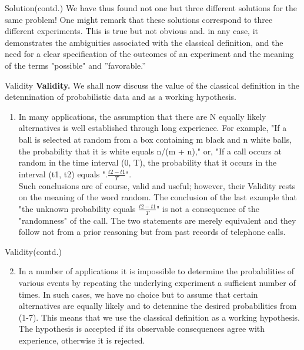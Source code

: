 \documentclass{beamer}
\begin{document}
\begin{frame}{Solution(contd.)}
    We have thus found not one but three different solutions for the same problem! One might remark that these solutions correspond to three different experiments. This is true but not obvious and. in any case, it demonstrates the ambiguities associated with the classical definition, and the need for a clear specification of the outcomes of an experiment and the meaning of the terms "possible" and ''favorable.''\\
\end{frame}
\begin{frame}{Validity}
\textbf{Validity.} We shall now discuss the value of the classical definition in the detennination of probabilistic data and as a working hypothesis.

\begin{enumerate}
\item In many applications, the assumption that there are N equally likely alternatives is well established through long experience. For example, "If a ball is selected at random from a box containing m black and n white balls, the probability that it is white equals n/(m + n)," or, "If a call occurs at random in the time interval (0, T), the probability that it occurs in the interval (t1, t2) equals ".$\frac {t2 - t1} {T}$".\\

Such conclusions are of course, valid and useful; however, their Validity rests on the meaning of the word random. The conclusion of the last example that "the unknown probability equals $\frac {t2 - t1} {T}$" is not a consequence of the "randomness" of the call. The two statements are merely equivalent and they follow not from a prior reasoning but from past records of telephone calls.\\
\end{enumerate}
\end{frame}
\begin{frame}{Validity(contd.)}
\begin{enumerate}\setcounter{enumi}{1}
\item In a number of applications it is impossible to determine the probabilities of various events by repeating the underlying experiment a sufficient number of times. In such cases, we have no choice but to assume that certain alternatives are equally likely and to detennine the desired probabilities from (1-7). This means that we use the classical definition as a working hypothesis. The hypothesis is accepted if its observable consequences agree with experience, otherwise it is rejected.
\end{enumerate}

\end{frame}
\end{document}
